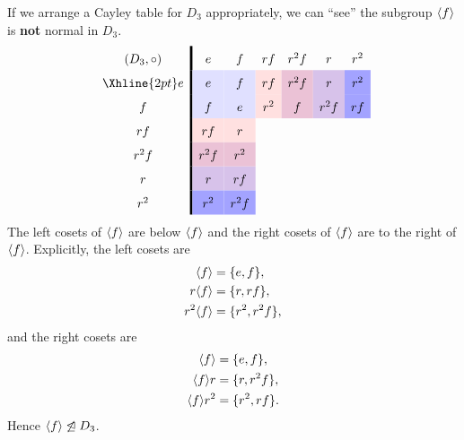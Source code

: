 \documentclass{ximera}
\begin{document}
\begin{example}
  If we arrange a Cayley table for $D_3$ appropriately, we can ``see''
  the subgroup $\langle f\rangle$ is \textbf{not} normal in $D_3$.
    \[
    \renewcommand{\arraystretch}{1.6}
    \begin{array}{c!{\vline width 2pt}cccccc}
      (D_3,\circ)& e                         & f                              & rf                            & r^2f                             & r                                    & r^2  \\  \Xhline{2pt}
      e          & e\cellcolor{blue!12!white}     & f\cellcolor{blue!12!white}    & rf\cellcolor{red!12!white}   & r^2f \cellcolor{blue!33!red!24!white}     & r  \cellcolor{blue!66!red!24!white}   & r^2 \cellcolor{blue!36!white} \\  
      f                & f\cellcolor{blue!12!white}    & e\cellcolor{blue!12!white}   & r^2 \cellcolor{red!12!white}    & f\cellcolor{blue!33!red!24!white} & r^2f \cellcolor{blue!66!red!24!white}    & rf \cellcolor{blue!36!white}   \\  
      rf                & rf\cellcolor{red!12!white}   & r\cellcolor{red!12!white}     &    &    &  &     \\  
      r^2f       & r^2f \cellcolor{blue!33!red!24!white}   & r^2 \cellcolor{blue!33!red!24!white}   &   &      &   &   \\  
      r      & r \cellcolor{blue!66!red!24!white}   & rf \cellcolor{blue!66!red!24!white} &    &   &      &     \\  
      r^2       & r^2 \cellcolor{blue!36!white} & r^2f \cellcolor{blue!36!white}    &   &    &     &      \\  
    \end{array}
    \]
    The left cosets of $\langle f\rangle$ are below $\langle f\rangle$ and the right cosets
    of $\langle f\rangle$ are to the right of $\langle f\rangle$. Explicitly, the left
    cosets are
    \begin{align*}
      \langle f\rangle &= \{e, f\},\\
      r\langle f\rangle &= \{r, rf\},\\
      r^2\langle f\rangle &= \{r^2, r^2f\},
    \end{align*}
    and the right cosets are
    \begin{align*}
      \langle f\rangle &= \{e, f\},\\
      \langle f\rangle r &= \{r, r^2f\},\\
      \langle f\rangle r^2&= \{r^2, rf\}.
    \end{align*}
    Hence $\langle f\rangle\not\trianglelefteq D_3$.
\end{example}
\end{document}
